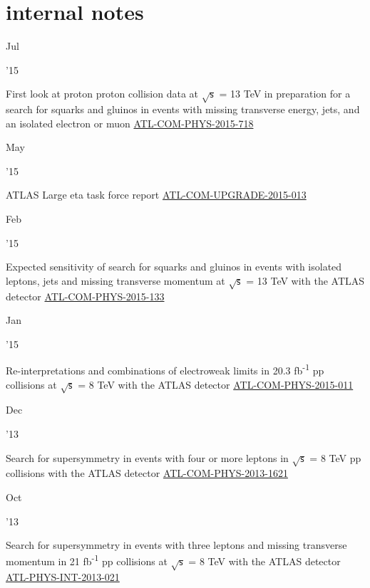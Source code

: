 \documentclass[]{cv} %
\begin{document}
\newpage
\ifinternalNotes
\section{internal notes}

\begin{entrylist}

  \entry
  {\parbox[t]{\parboxWidthOne}{Jul}\parbox[t]{\parboxWidthTwo}{\hfill '15}}
  {First look at proton proton collision data at $\sqrt{\mathsf{s}}$ = 13 TeV in
  preparation for a search for squarks and gluinos in events with missing
  transverse energy, jets, and an isolated electron or muon}
{\href{https://cds.cern.ch/record/2034389}{ATL-COM-PHYS-2015-718}}
{\vspace*{\spacingPubs}}

  \entry
  {\parbox[t]{\parboxWidthOne}{May}\parbox[t]{\parboxWidthTwo}{\hfill '15}}
  {ATLAS Large eta task force report}
{\href{https://cds.cern.ch/record/2016324}{ATL-COM-UPGRADE-2015-013}}
{\vspace*{\spacingPubs}}

  \entry
  {\parbox[t]{\parboxWidthOne}{Feb}\parbox[t]{\parboxWidthTwo}{\hfill '15}}
  {Expected sensitivity of search for squarks and gluinos in events with
    isolated leptons, jets and missing transverse momentum at
    $\sqrt{\mathsf{s}}$ = 13 TeV with the ATLAS detector}
{\href{https://cds.cern.ch/record/1994195}{ATL-COM-PHYS-2015-133}}
{\vspace*{\spacingPubs}}

  \entry
  {\parbox[t]{\parboxWidthOne}{Jan}\parbox[t]{\parboxWidthTwo}{\hfill '15}}
  {Re-interpretations and combinations of electroweak limits in
    20.3 fb\textsuperscript{-1} pp collisions at $\sqrt{\mathsf{s}}$
  = 8 TeV with the ATLAS detector}
{\href{https://cds.cern.ch/record/1981548}{ATL-COM-PHYS-2015-011}}
{\vspace*{\spacingPubs}}

  \entry
  {\parbox[t]{\parboxWidthOne}{Dec}\parbox[t]{\parboxWidthTwo}{\hfill '13}}
  {Search for supersymmetry in events with four or more leptons in $\sqrt{\mathsf{s}}$ = 8 TeV pp collisions with the ATLAS
detector}
{\href{https://cds.cern.ch/record/1635455}{ATL-COM-PHYS-2013-1621}}
{\vspace*{\spacingPubs}}

\entry
{\parbox[t]{\parboxWidthOne}{Oct}\parbox[t]{\parboxWidthTwo}{\hfill '13}}
{Search for supersymmetry in events with three leptons and missing transverse momentum in 21 fb\textsuperscript{-1} pp collisions
at $\sqrt{\mathsf{s}}$ = 8 TeV with the ATLAS detector}
{\href{https://cds.cern.ch/record/1610185}{ATL-PHYS-INT-2013-021}}
{\vspace*{\spacingPubs}}


\end{entrylist}
\end{document}
